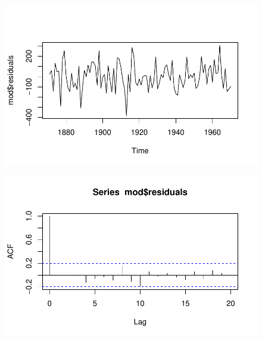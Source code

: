 \documentclass[
  letterpaper,
  DIV=11,
  numbers=noendperiod]{scrartcl}
\newenvironment{Shaded}{\begin{snugshade}}{\end{snugshade}}
\newcommand{\FunctionTok}[1]{\textcolor[rgb]{0.28,0.35,0.67}{#1}}
\newcommand{\NormalTok}[1]{\textcolor[rgb]{0.00,0.23,0.31}{#1}}
\newcommand{\SpecialCharTok}[1]{\textcolor[rgb]{0.37,0.37,0.37}{#1}}
\theoremstyle{plain}
\theoremstyle{plain}
\theoremstyle{definition}
\theoremstyle{definition}
\theoremstyle{remark}
\begin{document}
\begin{figure}[H]

{\centering \includegraphics{intervencao_files/figure-pdf/unnamed-chunk-8-1.pdf}

}

\end{figure}

\begin{Shaded}
\end{Shaded}

\begin{figure}[H]

{\centering \includegraphics{intervencao_files/figure-pdf/unnamed-chunk-8-2.pdf}

}

\end{figure}
\end{document}
